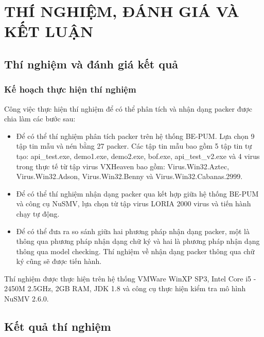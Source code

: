 
\newpage
\chapter{THÍ NGHIỆM, ĐÁNH GIÁ VÀ KẾT LUẬN}

\section{Thí nghiệm và đánh giá kết quả}

\subsection{Kế hoạch thực hiện thí nghiệm}

\hspace{0.5cm}Công việc thực hiện thí nghiệm để có thể phân tích và nhận dạng packer được chia làm các bước sau:

\begin{itemize}
\item{Để có thể thí nghiệm phân tích packer trên hệ thống BE-PUM. Lựa chọn 9 tập tin mẫu và nén bằng 27 packer. Các tập tin mẫu bao gồm 5 tập tin tự tạo: api\_test.exe, demo1.exe, demo2.exe, bof.exe, api\_test\_v2.exe và 4 virus trong thực tế từ tập virus VXHeaven bao gồm: Virus.Win32.Aztec, Virus.Win32.Adson, Virus.Win32.Benny và Virus.Win32.Cabanas.2999.\\}
\item{Để có thể thí nghiệm nhận dạng packer qua kết hợp giữa hệ thống BE-PUM và công cụ NuSMV, lựa chọn từ tập virus LORIA 2000 virus và tiến hành chạy tự động.} 
\item{Để có thể đưa ra so sánh giữa hai phương pháp nhận dạng packer, một là thông qua phương pháp nhận dạng chữ ký và hai là phương pháp nhận dạng thông qua model checking. Thí nghiệm về nhận dạng packer thông qua chữ ký cũng sẽ được tiến hành.}
\end{itemize}

\hspace{0.5cm}Thí nghiệm được thực hiện trên hệ thống VMWare WinXP SP3, Intel Core i5 - 2450M 2.5GHz, 2GB RAM, JDK 1.8 và công cụ thực hiện kiểm tra mô hình NuSMV 2.6.0.

\section{Kết quả thí nghiệm}

